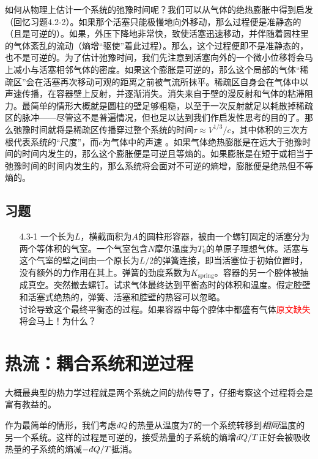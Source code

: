 如何从物理上估计一个系统的弛豫时间呢？我们可以从气体的绝热膨胀中得到启发（回忆习题4.2-2）。如果那个活塞只能极慢地向外移动，那么过程便是准静态的（且是可逆的）。如果，外压下降地非常快，致使活塞迅速移动，并伴随着圆柱里的气体紊乱的流动（熵增“驱使”着此过程）。那么，这个过程便即不是准静态的，也不是可逆的。为了估计弛豫时间，我们先注意到活塞向外的一个微小位移将会马上减小与活塞相邻气体的密度。如果这个膨胀是可逆的，那么这个局部的气体“稀疏区”会在活塞再次移动可观的距离之前被气流所抹平。稀疏区自身会在气体中以声速传播，在容器壁上反射，并逐渐消失。消失来自于壁的漫反射和气体的粘滞阻力。最简单的情形大概就是圆柱的壁足够粗糙，以至于一次反射就足以耗散掉稀疏区的脉冲——尽管这不是普遍情况，但也足以达到我们作启发性思考的目的了。那么弛豫时间就将是稀疏区传播穿过整个系统的时间$\tau\approx V^{1/3}/c$，其中体积的三次方根代表系统的“尺度”，而$c$为气体中的声速%
%
。如果气体绝热膨胀是在远大于弛豫时间的时间内发生的，那么这个膨胀便是可逆且等熵的。如果膨胀是在短于或相当于弛豫时间的时间内发生的，那么系统将会面对不可逆的熵增，膨胀便是绝热但不等熵的。

\subsection*{习题}
\begin{itemize}
\item[4.3-1] 一个长为$L$，横截面积为$A$的圆柱形容器，被由一个螺钉固定的活塞分为两个等体积的气室。一个气室包含$N$摩尔温度为$T_0$的单原子理想气体。活塞与这个气室的壁之间由一个原长为$L/2$的弹簧连接，即当活塞位于初始位置时，没有额外的力作用在其上。弹簧的劲度系数为$K_\text{spring}$。容器的另一个腔体被抽成真空。突然撤去螺钉。试求气体最终达到平衡态时的体积和温度。假定腔壁和活塞式绝热的，弹簧、活塞和腔壁的热容可以忽略。\\
讨论导致这个最终平衡态的过程。如果容器中每个腔体中都盛有气体\textcolor{red}{原文缺失}将会马上！为什么？
\end{itemize}

\section{热流：耦合系统和逆过程}
大概最典型的热力学过程就是两个系统之间的热传导了，仔细考察这个过程将会是富有教益的。

作为最简单的情形，我们考虑$d\hspace*{-0.08em}\bar{}\hspace*{0.1em} Q$的热量从温度为$T$的一个系统转移到{\it 相同}温度的另一个系统。这样的过程是可逆的，接受热量的子系统的熵增$d\hspace*{-0.08em}\bar{}\hspace*{0.1em} Q/T$正好会被吸收热量的子系统的熵减$-d\hspace*{-0.08em}\bar{}\hspace*{0.1em} Q/T$抵消。

